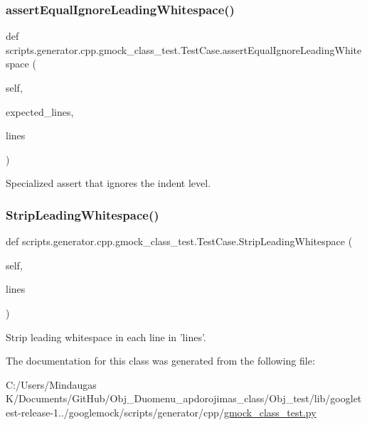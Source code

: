 \subsubsection{\texorpdfstring{assertEqualIgnoreLeadingWhitespace()}{assertEqualIgnoreLeadingWhitespace()}}
{\footnotesize\ttfamily def scripts.\+generator.\+cpp.\+gmock\+\_\+class\+\_\+test.\+Test\+Case.\+assert\+Equal\+Ignore\+Leading\+Whitespace (\begin{DoxyParamCaption}\item[{}]{self,  }\item[{}]{expected\+\_\+lines,  }\item[{}]{lines }\end{DoxyParamCaption})}

\begin{DoxyVerb}Specialized assert that ignores the indent level.\end{DoxyVerb}
 \mbox{\label{classscripts_1_1generator_1_1cpp_1_1gmock__class__test_1_1_test_case_a057e0f4b46415792f532ff1644ad08dc}} 
\subsubsection{\texorpdfstring{StripLeadingWhitespace()}{StripLeadingWhitespace()}}
{\footnotesize\ttfamily def scripts.\+generator.\+cpp.\+gmock\+\_\+class\+\_\+test.\+Test\+Case.\+Strip\+Leading\+Whitespace (\begin{DoxyParamCaption}\item[{}]{self,  }\item[{}]{lines }\end{DoxyParamCaption})}

\begin{DoxyVerb}Strip leading whitespace in each line in 'lines'.\end{DoxyVerb}
 

The documentation for this class was generated from the following file\+:\begin{DoxyCompactItemize}
\item 
C\+:/\+Users/\+Mindaugas K/\+Documents/\+Git\+Hub/\+Obj\+\_\+\+Duomenu\+\_\+apdorojimas\+\_\+class/\+Obj\+\_\+test/lib/googletest-\/release-\/1../googlemock/scripts/generator/cpp/\mbox{\hyperlink{_obj__test_2lib_2googletest-release-1_88_81_2googlemock_2scripts_2generator_2cpp_2gmock__class__test_8py}{gmock\+\_\+class\+\_\+test.\+py}}\end{DoxyCompactItemize}
